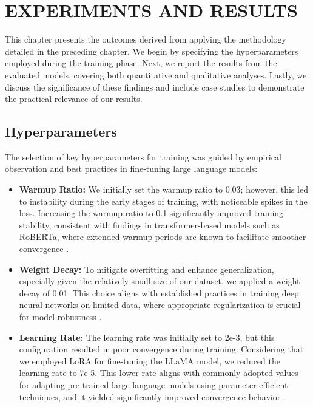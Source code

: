 \captionsetup[lstlisting]{font=small,labelfont=bf}



\chapter{ EXPERIMENTS AND RESULTS}

This chapter presents the outcomes derived from applying the methodology detailed in the preceding chapter. We begin by specifying the hyperparameters employed during the training phase. Next, we report the results from the evaluated models, covering both quantitative and qualitative analyses. Lastly, we discuss the significance of these findings and include case studies to demonstrate the practical relevance of our results.

\section{Hyperparameters}


The selection of key hyperparameters for training was guided by empirical observation and best practices in fine-tuning large language models:

\begin{itemize}
  \item \textbf{Warmup Ratio:} We initially set the warmup ratio to 0.03; however, this led to instability during the early stages of training, with noticeable spikes in the loss. Increasing the warmup ratio to 0.1 significantly improved training stability, consistent with findings in transformer-based models such as RoBERTa, where extended warmup periods are known to facilitate smoother convergence \citep{liu2019robertarobustlyoptimizedbert}.
  \item \textbf{Weight Decay:} To mitigate overfitting and enhance generalization, especially given the relatively small size of our dataset, we applied a weight decay of 0.01. This choice aligns with established practices in training deep neural networks on limited data, where appropriate regularization is crucial for model robustness \citep{brainacgan}.
  \item \textbf{Learning Rate:} The learning rate was initially set to 2e-3, but this configuration resulted in poor convergence during training. Considering that we employed LoRA for fine-tuning the LLaMA model, we reduced the learning rate to 7e-5. This lower rate aligns with commonly adopted values for adapting pre-trained large language models using parameter-efficient techniques, and it yielded significantly improved convergence behavior \citep{zhou2024automixqselfadjustingquantizationhigh}.
\end{itemize}

